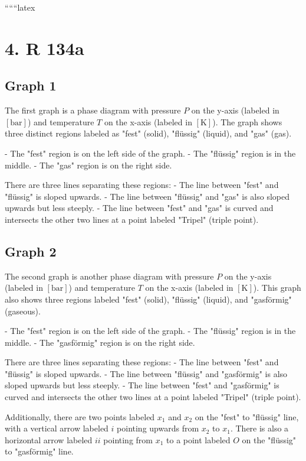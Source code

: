 
``````latex


\section*{4. R 134a}

\subsection*{Graph 1}
The first graph is a phase diagram with pressure \( P \) on the y-axis (labeled in \([ \text{bar} ]\)) and temperature \( T \) on the x-axis (labeled in \([ \text{K} ]\)). The graph shows three distinct regions labeled as "fest" (solid), "flüssig" (liquid), and "gas" (gas). 

- The "fest" region is on the left side of the graph.
- The "flüssig" region is in the middle.
- The "gas" region is on the right side.

There are three lines separating these regions:
- The line between "fest" and "flüssig" is sloped upwards.
- The line between "flüssig" and "gas" is also sloped upwards but less steeply.
- The line between "fest" and "gas" is curved and intersects the other two lines at a point labeled "Tripel" (triple point).

\subsection*{Graph 2}
The second graph is another phase diagram with pressure \( P \) on the y-axis (labeled in \([ \text{bar} ]\)) and temperature \( T \) on the x-axis (labeled in \([ \text{K} ]\)). This graph also shows three regions labeled "fest" (solid), "flüssig" (liquid), and "gasförmig" (gaseous).

- The "fest" region is on the left side of the graph.
- The "flüssig" region is in the middle.
- The "gasförmig" region is on the right side.

There are three lines separating these regions:
- The line between "fest" and "flüssig" is sloped upwards.
- The line between "flüssig" and "gasförmig" is also sloped upwards but less steeply.
- The line between "fest" and "gasförmig" is curved and intersects the other two lines at a point labeled "Tripel" (triple point).

Additionally, there are two points labeled \( x_1 \) and \( x_2 \) on the "fest" to "flüssig" line, with a vertical arrow labeled \( i \) pointing upwards from \( x_2 \) to \( x_1 \). There is also a horizontal arrow labeled \( ii \) pointing from \( x_1 \) to a point labeled \( O \) on the "flüssig" to "gasförmig" line.

